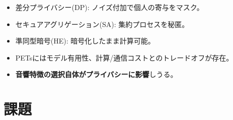 \documentclass[unicode,12pt,aspectratio=169, dvipdfmx]{beamer}
\begin{document}
\begin{frame}{\insertsectionhead}
\begin{itemize}
\begin{itemize}
            \item 差分プライバシー(DP): ノイズ付加で個人の寄与をマスク。
            \item セキュアアグリゲーション(SA): 集約プロセスを秘匿。
            \item 準同型暗号(HE): 暗号化したまま計算可能。
            \item PETsにはモデル有用性、計算/通信コストとのトレードオフが存在。
            \item \textbf{音響特徴の選択自体がプライバシーに影響}しうる。
        \end{itemize}
    \end{itemize}
\end{frame}

\section{課題}
\end{document}
